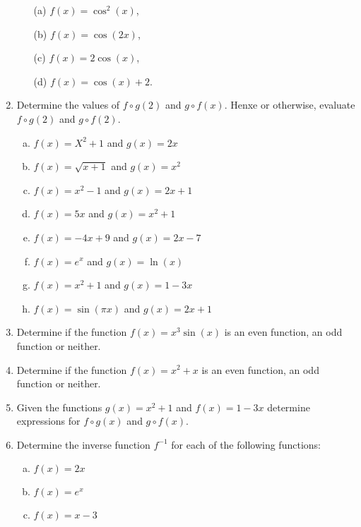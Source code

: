 \documentclass[a4paper,12pt]{article}
\begin{document}
\begin{enumerate}
\begin{multicols}{2}
\begin{itemize}
		
	\item[(a)] $f(x) = \cos^2(x)  $,
		\item[(b)] $f(x) = \cos(2x)  $,
	\item[(c)] $f(x) = 2\cos(x)  $,
		\item[(d)] $f(x) = \cos(x) +2$.
	\end{itemize}
	\end{multicols}
\item 
Determine the values of $f \circ g(2)$ and $g \circ f(x)$. Henxe or otherwise, evaluate $f \circ g(2)$ and $g \circ f(2)$.
\begin{multicols}{2}
	\begin{enumerate}[(a)]
		\item $f(x) = X^2 + 1$ and $g(x)= 2x$
		\item $f(x) = \sqrt{x+1}$ and $g(x)=x^2$
		\item $f(x) = x^2-1$ and $g(x) = 2x+1$
		
		\item $f(x) = 5x $ and $g(x)=x^2+1$
		\item $f(x) = -4x+9$ and $g(x) = 2x-7$
		\item $f(x) = e^x$ and $g(x)=\ln(x)$
		\item  $f(x) = x^2+1$ and $g(x) = 1-3x$
		\item $f(x) = \sin(\pi x)$ and $g(x) = 2x+1$
	\end{enumerate}	
\end{multicols}	
\item  Determine if the function $f(x) = x^3\sin(x)$ is an even function, an odd function or neither.
	
\item  Determine if the function $f(x) = x^2+x$ is an even function, an odd function or neither.
		
\item  Given the functions $g(x) = x^2+1$ and $f(x) = 1-3x$ determine expressions for $f \circ g(x)$ and $g \circ f(x)$.
\newpage
\item Determine the inverse function $f^{-1}$ for each of the following functions:
\begin{multicols}{2}
	\begin{enumerate}[(a)]
		\item	$f(x) = 2x$
		\item	$f(x) =e^x$
		\item	$f(x) = x-3$
		

\end{enumerate}
\end{multicols}
\end{enumerate}
\end{document}
